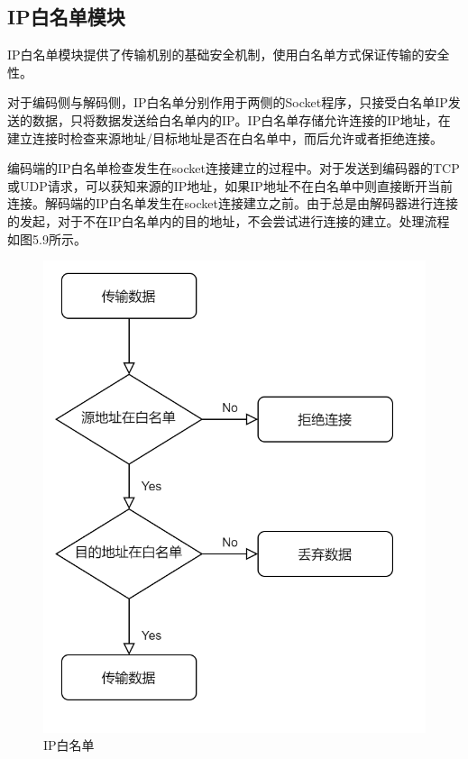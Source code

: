 \subsection{IP白名单模块}

IP白名单模块提供了传输机别的基础安全机制，使用白名单方式保证传输的安全性。

对于编码侧与解码侧，IP白名单分别作用于两侧的Socket程序，只接受白名单IP发送的数据，只将数据发送给白名单内的IP。IP白名单存储允许连接的IP地址，在建立连接时检查来源地址/目标地址是否在白名单中，而后允许或者拒绝连接。

编码端的IP白名单检查发生在socket连接建立的过程中。对于发送到编码器的TCP或UDP请求，可以获知来源的IP地址，如果IP地址不在白名单中则直接断开当前连接。解码端的IP白名单发生在socket连接建立之前。由于总是由解码器进行连接的发起，对于不在IP白名单内的目的地址，不会尝试进行连接的建立。处理流程如图5.9所示。

\begin{figure}[!htbp]
\centering
\includegraphics[scale=0.4]{figures/HW/N2.png}
\caption{IP白名单}
\end{figure}

